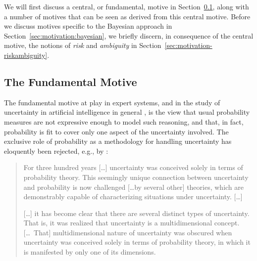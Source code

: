 We will first discuss a central, or fundamental, motive in Section~\ref{sec:motivation-fundamental},
along with a number of motives that can be seen as derived from this central motive.
Before we discuss motives specific to the Bayesian approach in Section~\ref{sec:motivation:bayesian},
we briefly discern, in consequence of the central motive, the notions of \emph{risk} and \emph{ambiguity}
in Section~\ref{sec:motivation-riskambiguity}.

\subsection{The Fundamental Motive}
\label{sec:motivation-fundamental}

The fundamental motive at play in expert systems,
and in the study of uncertainty in artificial intelligence in general \parencite[see, e.g.,][]{2006:lawry},
is the view that usual probability measures
are not expressive enough to model such reasoning,
and that, in fact, probability is fit to cover only one aspect of the uncertainty involved.
The exclusive role of probability as a methodology for handling uncertainty has eloquently been rejected,
e.g., by \textcite[p.~1]{1999:klir}: 
\begin{quotation}
For three hundred years [\ldots] uncertainty was conceived solely in
terms of probability theory. This seemingly unique connection
between uncertainty and probability is now challenged [\ldots by several
other] theories, which are demonstrably capable of characterizing
situations under uncertainty. [\ldots]

[\ldots] it has become clear that there are several distinct types of
uncertainty. That is, it was realized that uncertainty is a
multidimensional concept. [\ldots\ That] multidimensional nature of
uncertainty was obscured when uncertainty was conceived solely in
terms of probability theory, in which it is manifested by only one
of its dimensions.
\end{quotation}

